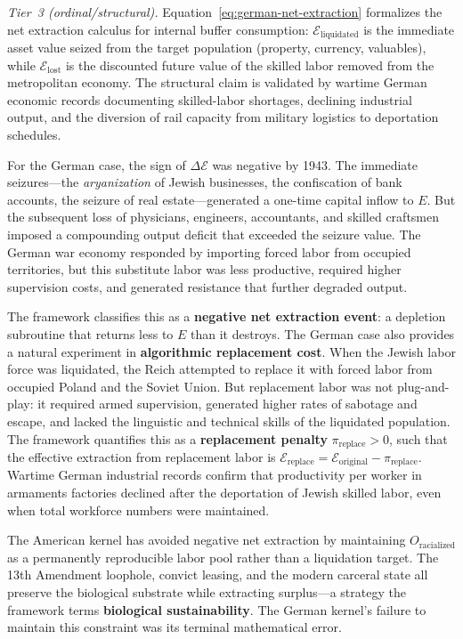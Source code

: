 \noindent\textit{Tier~3 (ordinal/structural).} Equation~\ref{eq:german-net-extraction} formalizes the net extraction calculus for internal buffer consumption: $\mathcal{E}_{\text{liquidated}}$ is the immediate asset value seized from the target population (property, currency, valuables), while $\mathcal{E}_{\text{lost}}$ is the discounted future value of the skilled labor removed from the metropolitan economy. The structural claim is validated by wartime German economic records documenting skilled-labor shortages, declining industrial output, and the diversion of rail capacity from military logistics to deportation schedules.

For the German case, the sign of $\Delta \mathcal{E}$ was negative by 1943. The immediate seizures---the \textit{aryanization} of Jewish businesses, the confiscation of bank accounts, the seizure of real estate---generated a one-time capital inflow to $E$. But the subsequent loss of physicians, engineers, accountants, and skilled craftsmen imposed a compounding output deficit that exceeded the seizure value. The German war economy responded by importing forced labor from occupied territories, but this substitute labor was less productive, required higher supervision costs, and generated resistance that further degraded output.

The framework classifies this as a \textbf{negative net extraction event}: a depletion subroutine that returns less to $E$ than it destroys. The German case also provides a natural experiment in \textbf{algorithmic replacement cost}. When the Jewish labor force was liquidated, the Reich attempted to replace it with forced labor from occupied Poland and the Soviet Union. But replacement labor was not plug-and-play: it required armed supervision, generated higher rates of sabotage and escape, and lacked the linguistic and technical skills of the liquidated population. The framework quantifies this as a \textbf{replacement penalty} $\pi_{\text{replace}} > 0$, such that the effective extraction from replacement labor is $\mathcal{E}_{\text{replace}} = \mathcal{E}_{\text{original}} - \pi_{\text{replace}}$. Wartime German industrial records confirm that productivity per worker in armaments factories declined after the deportation of Jewish skilled labor, even when total workforce numbers were maintained.

The American kernel has avoided negative net extraction by maintaining $O_{\text{racialized}}$ as a permanently reproducible labor pool rather than a liquidation target. The 13th Amendment loophole, convict leasing, and the modern carceral state all preserve the biological substrate while extracting surplus---a strategy the framework terms \textbf{biological sustainability}. The German kernel's failure to maintain this constraint was its terminal mathematical error.

